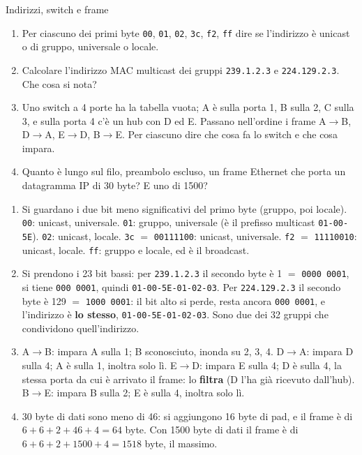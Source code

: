 \begin{esercizio}{Indirizzi, switch e frame}
\begin{enumerate}[label=(\alph*)]
    \item Per ciascuno dei primi byte \texttt{00}, \texttt{01}, \texttt{02}, \texttt{3c}, \texttt{f2}, \texttt{ff} dire se l'indirizzo è
          unicast o di gruppo, universale o locale.
    \item Calcolare l'indirizzo MAC multicast dei gruppi \texttt{239.1.2.3} e \texttt{224.129.2.3}. Che cosa si nota?
    \item Uno switch a 4 porte ha la tabella vuota; A è sulla porta 1, B sulla 2, C sulla 3, e sulla porta 4 c'è un hub con D ed E.
          Passano nell'ordine i frame A$\rightarrow$B, D$\rightarrow$A, E$\rightarrow$D, B$\rightarrow$E. Per ciascuno dire che cosa
          fa lo switch e che cosa impara.
    \item Quanto è lungo sul filo, preambolo escluso, un frame Ethernet che porta un datagramma IP di 30 byte? E uno di 1500?
\end{enumerate}

\svolgimento
\begin{enumerate}[label=(\alph*)]
    \item Si guardano i due bit meno significativi del primo byte (gruppo, poi locale). \texttt{00}: unicast, universale.
          \texttt{01}: gruppo, universale (è il prefisso multicast \texttt{01-00-5E}). \texttt{02}: unicast, locale. \texttt{3c}
          $=$ \texttt{00111100}: unicast, universale. \texttt{f2} $=$ \texttt{11110010}: unicast, locale. \texttt{ff}: gruppo e
          locale, ed è il broadcast.
    \item Si prendono i 23 bit bassi: per \texttt{239.1.2.3} il secondo byte è 1 $=$ \texttt{0000\,0001}, si tiene \texttt{000\,0001},
          quindi \texttt{01-00-5E-01-02-03}. Per \texttt{224.129.2.3} il secondo byte è 129 $=$ \texttt{1000\,0001}: il bit alto si
          perde, resta ancora \texttt{000\,0001}, e l'indirizzo è \textbf{lo stesso}, \texttt{01-00-5E-01-02-03}. Sono due dei 32
          gruppi che condividono quell'indirizzo.
    \item A$\rightarrow$B: impara A sulla 1; B sconosciuto, inonda su 2, 3, 4. D$\rightarrow$A: impara D sulla 4; A è sulla 1,
          inoltra solo lì. E$\rightarrow$D: impara E sulla 4; D è sulla 4, la stessa porta da cui è arrivato il frame: lo
          \textbf{filtra} (D l'ha già ricevuto dall'hub). B$\rightarrow$E: impara B sulla 2; E è sulla 4, inoltra solo lì.
    \item 30 byte di dati sono meno di 46: si aggiungono 16 byte di pad, e il frame è di $6 + 6 + 2 + 46 + 4 = 64$ byte. Con 1500
          byte di dati il frame è di $6 + 6 + 2 + 1500 + 4 = 1518$ byte, il massimo.
\end{enumerate}
\end{esercizio}

